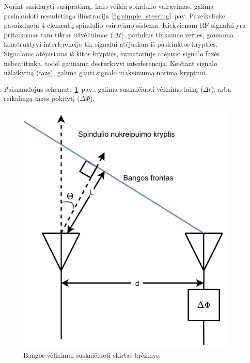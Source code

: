 \documentclass[main.tex]{subfiles}
\begin{document}
Norint susidaryti susipratimą, kaip veikia spindulio vairavimas, galima
pasinaudoti nesudėtinga iliustracija \ref{fig:simple_steering}~pav.
Paveiksliuke pavaizduota 4 elementų spindulio vairavimo sistema. Kiekvienam
RF signalui yra pritaikomas tam tikras užvėlinimas ($\Delta t$), parinkus
tinkamas vertes, gaunama konstruktyvi interferencija tik signalui atėjusiam
iš pasirinktos krypties. Signalams atėjusiams iš kitos krypties, sumatoriuje
atėjusio signalo fazės nebeatitinka, todėl gaunama desturktyvi interferencija.
Keičiant signalo užlaikymą (fazę), galima gauti signalo maksimumą norima
kryptimi.

Paisnaudojus schemute \ref{fig:beamform_path}~pav., galima suskaičiuoti vėlinimo laiką ($\Delta t$), arba reikalingą
fazės pokitytį ($\Delta\Phi$).

\begin{figure}[h]
    \begin{centering}
    \includegraphics[scale=0.8]{drawings/beamform_path}
    \par\end{centering}
    \protect\caption{\label{fig:beamform_path}Bangos vėlinimui suskaičiuoti skirtas brėžinys.}
\end{figure}
\end{document}

